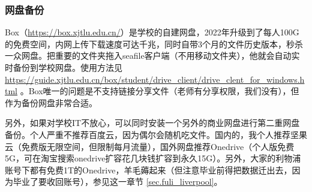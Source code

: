 \subsubsection{网盘备份}
\label{sec.net_drive_backup}

Box（\url{https://box.xjtlu.edu.cn/}）是学校的自建网盘，2022年升级到了每人100G的免费空间，内网上传下载速度可达千兆，同时自带3个月的文件历史版本，秒杀一众网盘。把重要的文件夹拖入seafile客户端（不用移动文件夹），他就会自动实时备份到学校网盘。使用方法见 \url{https://guide.xjtlu.edu.cn/box/student/drive_client/drive_clent_for_windows.html} 。Box唯一的问题是不支持链接分享文件（老师有分享权限，我们没有），但作为备份网盘非常合适。

另外，如果对学校IT不放心，可以同时安装一个另外的商业网盘进行第二重网盘备份。个人严重不推荐百度云，因为偶尔会随机吃文件。国内的，我个人推荐坚果云（免费版无限空间，但限制每月流量），国外网盘推荐Onedrive（个人版免费5G，可在淘宝搜索onedrive扩容花几块钱扩容到永久15G）。另外，大家的利物浦账号下都有免费1T的Onedrive，羊毛薅起来（但注意毕业前得把数据迁出去，因为毕业了要收回账号），参见这一章节 \ref{sec.fuli_liverpool}。


